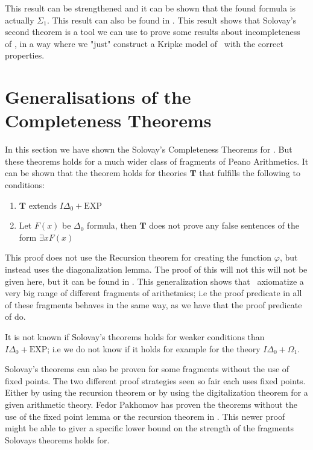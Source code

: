 \documentclass[../main.tex]{subfiles}
\begin{document}
This result can be strengthened and it can be shown that the found formula is
actually $\Sigma_1$. This result can also be found in \parencite{Smor1985}.
This result shows that Solovay's second theorem is a tool we can use to prove
some results about incompleteness of \PRA, in a way where we "just" construct a
Kripke model of \GL\ with the correct properties.
\section{Generalisations  of the Completeness Theorems}

In this section we have shown the Solovay's Completeness Theorems for \PRA.
But these theorems holds for a much wider class of fragments of Peano
Arithmetics. It can be shown that the theorem holds for
theories $\textbf{T}$ that fulfills the following to conditions:
\begin{enumerate}
	\item $\textbf{T}$ extends $I\Delta_0+\text{EXP}$
	\item Let $F(x)$ be $ \Delta_0$ formula, then $\textbf{T}$ does not prove any
		false sentences of the form $\exists x F(x)$
\end{enumerate}

This proof does not use the Recursion theorem for creating the function
$\varphi$, but instead uses the diagonalization lemma. The
proof of this will not this will not be given here, but it can be found in
\parencite{Dick1991}. This generalization shows that \GL\ axiomatize a very big
range of different fragments of arithetmics; i.e the proof predicate in all of
these fragments behaves in the same way, as we have that the proof predicate of
\PRA do.

It is not known if Solovay's theorems holds for weaker conditions than
$I\Delta_0+\text{EXP}$; i.e we do not know if it holds for example for the theory
$I\Delta_0+\Omega_1$.



Solovay's theorems can also be proven for some fragments without the use of
fixed points. The two different proof strategies seen so fair each uses fixed
points. Either by using the recursion theorem or by using the digitalization
theorem for a given arithmetic theory. Fedor Pakhomov has proven the theorems
without the use of the fixed point lemma or the recursion theorem in
\parencite{Fedo2017}. This
newer proof might be able to giver a specific lower bound on the strength of
the fragments Solovays theorems holds for.
\end{document}
